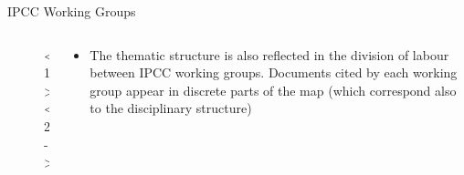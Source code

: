 \documentclass[9pt]{beamer}
\begin{document}
\begin{frame}{IPCC Working Groups}
\begin{columns}
	\begin{column}{0.618\linewidth}
		\begin{figure}
		<1>
		<2->
		\label{map-wgs}
\end{figure}
	\end{column}
	\begin{column}{0.382\linewidth}
		\begin{itemize}
	\item The thematic structure is also reflected in the division of labour between IPCC working groups. Documents cited by each working group appear in discrete parts of the map (which correspond also to the disciplinary structure)


		\end{itemize}
	\end{column}
\end{columns}
\end{frame}
\end{document}
